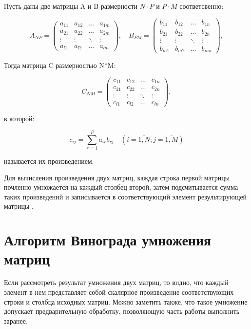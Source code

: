 Пусть даны две матрицы A и B размерности $N \cdot P$ и $P \cdot M$ соответсвенно:

\begin{equation}
	A_{NP} = \begin{pmatrix}
		a_{11} & a_{12} & \ldots & a_{1m}\\
		a_{21} & a_{22} & \ldots & a_{2m}\\
		\vdots & \vdots & \ddots & \vdots\\
		a_{l1} & a_{l2} & \ldots & a_{lm}
	\end{pmatrix},
	\quad
	B_{PM} = \begin{pmatrix}
		b_{11} & b_{12} & \ldots & b_{1n}\\
		b_{21} & b_{22} & \ldots & b_{2n}\\
		\vdots & \vdots & \ddots & \vdots\\
		b_{m1} & b_{m2} & \ldots & b_{mn}
	\end{pmatrix},
\end{equation}

Тогда матрица C размерностью N*M:

\begin{equation}
	C_{NM} = \begin{pmatrix}
		c_{11} & c_{12} & \ldots & c_{1n}\\
		c_{21} & c_{22} & \ldots & c_{2n}\\
		\vdots & \vdots & \ddots & \vdots\\
		c_{l1} & c_{l2} & \ldots & c_{ln}
	\end{pmatrix},
\end{equation}

в которой:

\begin{equation}
	\label{eq:M}
	c_{ij} =
	\sum_{r=1}^{P} a_{ir}b_{rj} \quad (i=\overline{1,N}; j=\overline{1,M})
\end{equation}

называется их произведением.

Для вычисления произведения двух матриц, каждая строка первой матрицы почленно умножается на каждый столбец второй, затем подсчитывается сумма таких произведений и записывается в соответствующий элемент результирующей матрицы \cite{alg}.

\section{Алгоритм Винограда умножения матриц}

Если рассмотреть результат умножения двух матриц, то видно, что каждый элемент в нем представляет собой скалярное произведение соответствующих строки и столбца исходных матриц. Можно заметить также, что такое умножение допускает предварительную обработку, позволяющую часть работы выполнить заранее.

